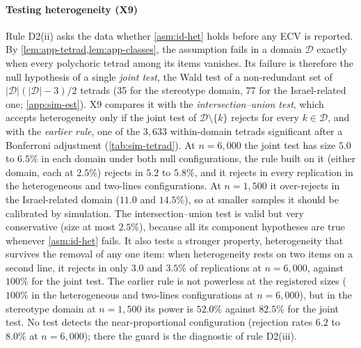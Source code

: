 \paragraph{Testing heterogeneity (X9)}
Rule D2(ii) asks the data whether \cref{asm:id-het} holds before any ECV is reported. By \cref{lem:app-tetrad,lem:app-classes}, the assumption fails in a domain $\mathcal D$ exactly when every polychoric tetrad among its items vanishes. Its failure is therefore the null hypothesis of a single \emph{joint test}, the Wald test of a non-redundant set of $|\mathcal D|(|\mathcal D|-3)/2$ tetrads (35 for the stereotype domain, 77 for the Israel-related one; \cref{app:sim-est}). X9 compares it with the \emph{intersection--union test}, which accepts heterogeneity only if the joint test of $\mathcal D\setminus\{k\}$ rejects for every $k\in\mathcal D$, and with the \emph{earlier rule}, one of the $3{,}633$ within-domain tetrads significant after a Bonferroni adjustment (\cref{tab:sim-tetrad}). At $n=6{,}000$ the joint test has size $5.0$ to $6.5\%$ in each domain under both null configurations, the rule built on it (either domain, each at $2.5\%$) rejects in $5.2$ to $5.8\%$, and it rejects in every replication in the heterogeneous and two-lines configurations. At $n=1{,}500$ it over-rejects in the Israel-related domain ($11.0$ and $14.5\%$), so at smaller samples it should be calibrated by simulation. The intersection--union test is valid but very conservative (size at most $2.5\%$), because all its component hypotheses are true whenever \cref{asm:id-het} fails. It also tests a stronger property, heterogeneity that survives the removal of any one item: when heterogeneity rests on two items on a second line, it rejects in only $3.0$ and $3.5\%$ of replications at $n=6{,}000$, against $100\%$ for the joint test. The earlier rule is not powerless at the registered sizes ($100\%$ in the heterogeneous and two-lines configurations at $n=6{,}000$), but in the stereotype domain at $n=1{,}500$ its power is $52.0\%$ against $82.5\%$ for the joint test. No test detects the near-proportional configuration (rejection rates $6.2$ to $8.0\%$ at $n=6{,}000$); there the guard is the diagnostic of rule D2(iii).

\begin{table}[tbp]
\centering
\caption{X9, tests of within-domain heterogeneity (\cref{asm:id-het}) at the registered sizes (synthetic data; $R=400$ at $n=6{,}000$, $200$ at $n=1{,}500$). Rejection rates (\%) per domain at the 5\% level of the joint tetrad test, the intersection--union test (IUT) and the earlier Bonferroni rule over $3{,}633$ tetrads; D2(ii): heterogeneity accepted in at least one domain, with the joint and intersection--union tests at $2.5\%$ per domain. $^{0}$ fails in both domains, so the rates are sizes. Two lines: two items of each domain lie on a second line through the origin of the loading plane.}
\label{tab:sim-tetrad}
\footnotesize
\setlength{\tabcolsep}{3.6pt}

\end{table}

